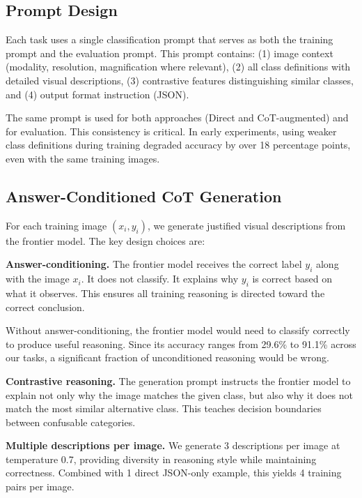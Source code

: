 \documentclass{bmvc2k}
\begin{document}
\subsection{Prompt Design}

Each task uses a single classification prompt that serves as both the training prompt and the evaluation prompt. This prompt contains: (1) image context (modality, resolution, magnification where relevant), (2) all class definitions with detailed visual descriptions, (3) contrastive features distinguishing similar classes, and (4) output format instruction (JSON).

The same prompt is used for both approaches (Direct and CoT-augmented) and for evaluation. This consistency is critical. In early experiments, using weaker class definitions during training degraded accuracy by over 18 percentage points, even with the same training images.

\subsection{Answer-Conditioned CoT Generation}

For each training image $(x_i, y_i)$, we generate justified visual descriptions from the frontier model. The key design choices are:

\noindent\textbf{Answer-conditioning.} The frontier model receives the correct label $y_i$ along with the image $x_i$. It does not classify. It explains why $y_i$ is correct based on what it observes. This ensures all training reasoning is directed toward the correct conclusion.

Without answer-conditioning, the frontier model would need to classify correctly to produce useful reasoning. Since its accuracy ranges from 29.6\% to 91.1\% across our tasks, a significant fraction of unconditioned reasoning would be wrong.

\noindent\textbf{Contrastive reasoning.} The generation prompt instructs the frontier model to explain not only why the image matches the given class, but also why it does not match the most similar alternative class. This teaches decision boundaries between confusable categories.

\noindent\textbf{Multiple descriptions per image.} We generate 3 descriptions per image at temperature 0.7, providing diversity in reasoning style while maintaining correctness. Combined with 1 direct JSON-only example, this yields 4 training pairs per image.
\end{document}

